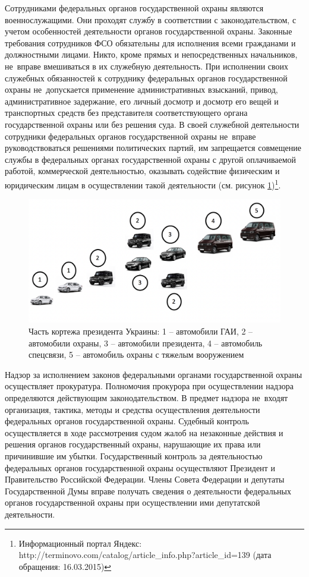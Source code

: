 \documentclass[a4paper,12pt,fleqn]{article} %
\begin{document}
Сотрудниками федеральных органов государственной охраны являются военнослужащими. Они проходят службу в соответствии с законодательством, с учетом особенностей деятельности органов государственной охраны. Законные требования сотрудников ФСО обязательны для исполнения всеми гражданами и должностными лицами. Никто, кроме прямых и непосредственных начальников, не~вправе вмешиваться в их служебную деятельность. При исполнении своих служебных обязанностей к сотруднику федеральных органов государственной охраны не~допускается применение административных взысканий, привод, административное задержание, его личный досмотр и досмотр его вещей и транспортных средств без представителя соответствующего органа государственной охраны или без решения суда. В своей служебной деятельности сотрудники федеральных органов государственной охраны не~вправе руководствоваться решениями политических партий, им запрещается совмещение службы в федеральных органах государственной охраны с другой оплачиваемой работой, коммерческой деятельностью, оказывать содействие физическим и юридическим лицам в осуществлении такой деятельности (см. рисунок \ref{image8})\footnote{Информационный портал Яндекс: http://terminovo.com/catalog/article\_info.php?article\_id=139 (дата обращения: 16.03.2015)}.

\begin{figure}[h]
	\centering
	\includegraphics[scale=0.6]{img8}
	\caption{Часть кортежа президента Украины: 1 – автомобили ГАИ, 2 – автомобили охраны, 3 – автомобили президента, 4 – автомобиль спецсвязи, 5 – автомобиль охраны с тяжелым вооружением}
	\label{image8}
\end{figure}

Надзор за исполнением законов федеральными органами государственной охраны осуществляет прокуратура. Полномочия прокурора при осуществлении надзора определяются действующим законодательством. В предмет надзора не~входят организация, тактика, методы и средства осуществления деятельности федеральных органов государственной охраны. 	Судебный контроль осуществляется в ходе рассмотрения судом жалоб на незаконные действия и решения органов государственный охраны, нарушающие их права или причинившие им убытки. 	Государственный контроль за деятельностью федеральных органов государственной охраны осуществляют Президент и Правительство Российской Федерации. Члены Совета Федерации и депутаты Государственной Думы вправе получать сведения о деятельности федеральных органов государственной охраны при осуществлении ими депутатской деятельности.
\end{document}
